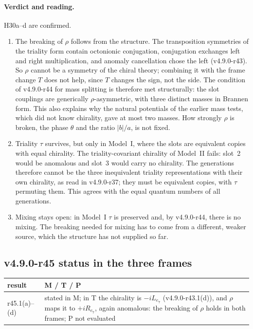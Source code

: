 \paragraph{Verdict and reading.}
H30a--d are confirmed.
\begin{enumerate}[leftmargin=2em]
\item The breaking of \(\rho\) follows from the structure.  The transposition symmetries of the triality form contain octonionic
conjugation, conjugation exchanges left and right multiplication, and anomaly cancellation chose the left (v4.9.0-r43).  So \(\rho\) cannot be
a symmetry of the chiral theory; combining it with the frame change \(T\) does not help, since \(T\) changes the sign, not the side.  The
condition of v4.9.0-r44 for mass splitting is therefore met structurally: the slot couplings are generically \(\rho\)-asymmetric, with three
distinct masses in Brannen form.  This also explains why the natural potentials of the earlier mass tests, which did not know chirality, gave
at most two masses.  How strongly \(\rho\) is broken, the phase \(\theta\) and the ratio \(|b|/a\), is not fixed.
\item Triality \(\tau\) survives, but only in Model~I, where the slots are equivalent copies with equal chirality.  The triality-covariant
chirality of Model~II fails: slot~2 would be anomalous and slot~3 would carry no chirality.  The generations therefore cannot be the three
inequivalent triality representations with their own chirality, as read in v4.9.0-r37; they must be equivalent copies, with \(\tau\) permuting
them.  This agrees with the equal quantum numbers of all generations.
\item Mixing stays open: in Model~I \(\tau\) is preserved and, by v4.9.0-r44, there is no mixing.  The breaking needed for mixing has to come
from a different, weaker source, which the structure has not supplied so far.
\end{enumerate}

\subsection*{v4.9.0-r45 status in the three frames}
\label{subsec:v490-r45-frames}

\begin{center}
\small
\begin{tabular}{@{}>{\raggedright\arraybackslash}p{}>{\raggedright\arraybackslash}p{}@{}}
\toprule
result & M / T / P\\
\midrule
r45.1(a)--(d) & stated in M; in T the chirality is \(-iL_{e_7}\) (v4.9.0-r43.1(d)), and \(\rho\) maps it to \(+iR_{e_7}\), again anomalous: the breaking of \(\rho\) holds in both frames; P not evaluated\\
\bottomrule
\end{tabular}
\end{center}

